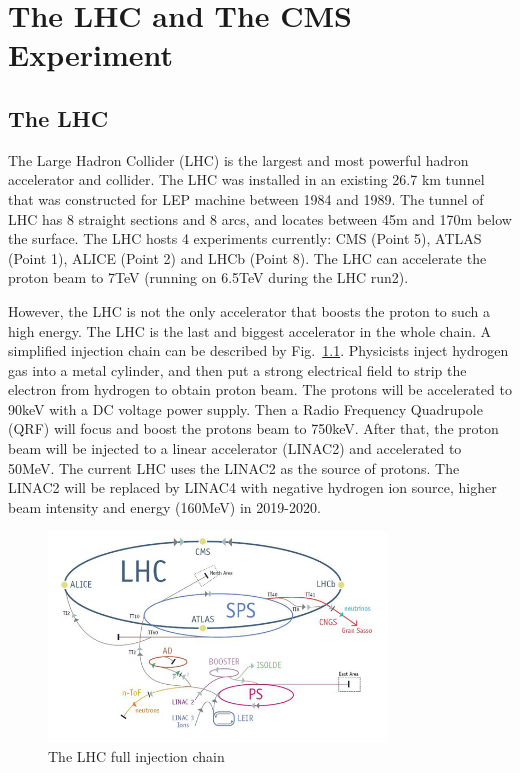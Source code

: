\chapter{The LHC and The CMS Experiment}

\section{The LHC}

The Large Hadron Collider (LHC) is the largest and most powerful hadron accelerator and collider. The LHC was installed in an existing 26.7 km tunnel that was constructed for LEP machine between 1984 and 1989. The tunnel of LHC has 8 straight sections and 8 arcs, and locates between 45m and 170m below the surface. The LHC hosts 4 experiments currently: CMS (Point 5), ATLAS (Point 1), ALICE (Point 2) and LHCb (Point 8). The LHC can accelerate the proton beam to 7TeV (running on 6.5TeV during the LHC run2).

However, the LHC is not the only accelerator that boosts the proton to such a high energy. The LHC is the last and biggest accelerator in the whole chain. A simplified injection chain can be described by Fig.~\ref{fig:c3lhclpsspslhc}. Physicists inject hydrogen gas into a metal cylinder, and then put a strong electrical field to strip the electron from hydrogen to obtain proton beam. The protons will be accelerated to 90keV with a DC voltage power supply. Then a Radio Frequency Quadrupole (QRF) will focus and boost the protons beam to 750keV. After that, the proton beam will be injected to a linear accelerator (LINAC2) and accelerated to 50MeV. The current LHC uses the LINAC2 as the source of protons. The LINAC2 will be replaced by LINAC4 with negative hydrogen ion source, higher beam intensity and energy (160MeV) in 2019-2020. 

\begin{figure}[htbp]
 \begin{center}
  \includegraphics[width=0.8\textwidth]{figures/c3/c3_lhc_lpsspslhc.jpg}
 \end{center}
 \caption{The LHC full injection chain}
 \label{fig:c3lhclpsspslhc}
\end{figure}

